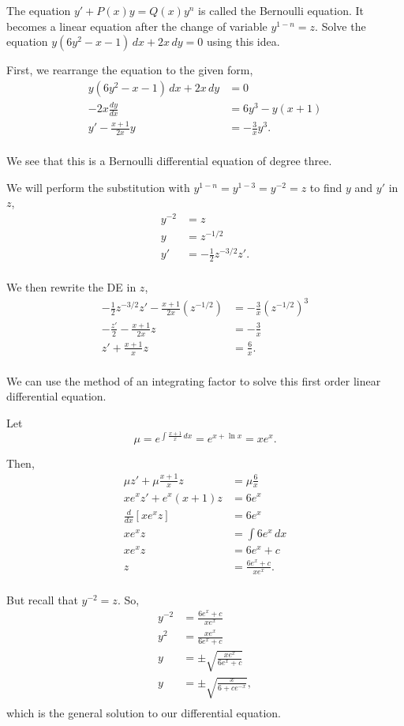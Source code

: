 \documentclass[../hw5]{subfiles}
\begin{document}
The equation $y'+P(x)y=Q(x)y^n$ is called the Bernoulli equation. It becomes a linear equation after the change of variable $y^{1-n}=z$. Solve the equation $y(6y^2-x-1)\,dx+2x\,dy=0$ using this idea.

First, we rearrange the equation to the given form,
\begin{align*}
    y(6y^2-x-1)\,dx+2x\,dy&=0\\
    -2x\frac{dy}{dx}&=6y^3-y(x+1)\\
    y'-\frac{x+1}{2x}y&=-\frac{3}{x}y^3.\\
\end{align*}

We see that this is a Bernoulli differential equation of degree three.

We will perform the substitution with $y^{1-n}=y^{1-3}=y^{-2}=z$ to find $y$ and $y'$ in $z$,
\begin{align*}
    y^{-2}&=z\\
    y&=z^{-1/2}\\
    y'&=-\frac{1}{2}z^{-3/2}z'.\\
\end{align*}

We then rewrite the DE in $z$,
\begin{align*}
    -\frac{1}{2}z^{-3/2}z'-\frac{x+1}{2x}\left( z^{-1/2} \right)&=-\frac{3}{x}{\left( z^{-1/2} \right)}^3\\
    -\frac{z'}{2}-\frac{x+1}{2x}z&=-\frac{3}{x}\\
    z'+\frac{x+1}{x}z&=\frac{6}{x}.\\
\end{align*}

We can use the method of an integrating factor to solve this first order linear differential equation.

Let \[\mu=e^{\int \frac{x+1}{x}\,dx}=e^{x+\ln{x}}=xe^x.\]

Then,
\begin{align*}
    \mu z'+\mu\frac{x+1}{x}z&=\mu\frac{6}{x}\\
    xe^x z'+e^x(x+1)z&=6e^x\\
    \frac{d}{dx}\left[ xe^x z \right]&=6e^x\\
    xe^x z&=\int 6e^x\,dx\\
    xe^x z&=6e^x+c\\
    z&=\frac{6e^x+c}{xe^x}.\\
\end{align*}

But recall that $y^{-2}=z$. So,
\begin{align*}
    y^{-2}&=\frac{6e^x+c}{xe^x}\\
    y^2&=\frac{xe^x}{6e^x+c}\\
    y&=\pm\sqrt{\frac{xe^x}{6e^x+c}}\\
    y&=\pm\sqrt{\frac{x}{6+ce^{-x}}},\\
\end{align*}
which is the general solution to our differential equation.
\end{document}
